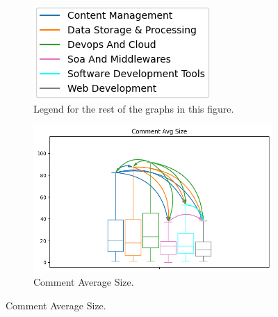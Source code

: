 \documentclass[10pt,a4paper,twocolumn]{article}
\begin{document}
\begin{figure}
    \centering
    \begin{subfigure}{.35\textwidth}
      \centering
      \includegraphics[width=\linewidth]{rq2_mw/domlegend.png}
      \caption{Legend for the rest of the graphs in this figure.}
    \end{subfigure}
    \begin{subfigure}{.4\textwidth}
      \centering
      \includegraphics[width=\linewidth]{rq2_mw/comment avg size_high_conf_plot_arrows.png}
      \caption{Comment Average Size.}
    \end{subfigure}
    

\end{figure}
\end{document}
